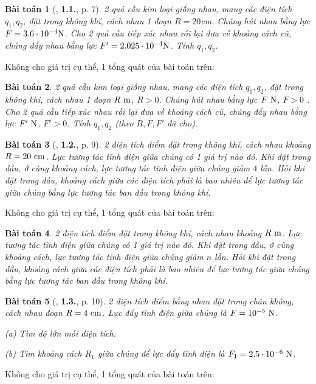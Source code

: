 \documentclass{article}
\numberwithin{equation}{section}
\newtheorem{baitoan}{Bài toán}[section]
\begin{document}
\begin{baitoan}[\cite{Giai_Toan_Vat_Ly_11_tap_1}, \textbf{1.1.}, p. 7]
	2 quả cầu kim loại giống nhau, mang các điện tích $q_1,q_2$, đặt trong không khí, cách nhau 1 đoạn $R = 20$cm. Chúng hút nhau bằng lực $F = 3.6\cdot 10^{-4}{\rm N}$. Cho 2 quả cầu tiếp xúc nhau rồi lại đưa về khoảng cách cũ, chúng đẩy nhau bằng lực $F' = 2.025\cdot 10^{-4}{\rm N}$. Tính $q_1,q_2$.
\end{baitoan}
Không cho giá trị cụ thể, 1 tổng quát của bài toán trên:

\begin{baitoan}
	2 quả cầu kim loại giống nhau, mang các điện tích $q_1,q_2$, đặt trong không khí, cách nhau 1 đoạn $R\ {\rm m}$, $R > 0$. Chúng hút nhau bằng lực $F\ {\rm N}$, $F > 0$ . Cho 2 quả cầu tiếp xúc nhau rồi lại đưa về khoảng cách cũ, chúng đẩy nhau bằng lực $F'\ {\rm N}$, $F' > 0$. Tính $q_1,q_2$ (theo $R,F,F'$ đã cho).
\end{baitoan}

\begin{baitoan}[\cite{Giai_Toan_Vat_Ly_11_tap_1}, \textbf{1.2.}, p. 9]
	2 điện tích điểm đặt trong không khí, cách nhau khoảng $R = 20\ {\rm cm}$. Lực tương tác tĩnh điện giữa chúng có 1 giá trị nào đó. Khi đặt trong dầu, ở cùng khoảng cách, lực tương tác tĩnh điện giữa chúng giảm $4$ lần. Hỏi khi đặt trong dầu, khoảng cách giữa các điện tích phải là bao nhiêu để lực tương tác giữa chúng bằng lực tương tác ban đầu trong không khí.
\end{baitoan}
Không cho giá trị cụ thể, 1 tổng quát của bài toán trên:

\begin{baitoan}
	2 điện tích điểm đặt trong không khí, cách nhau khoảng $R\ {\rm m}$. Lực tương tác tĩnh điện giữa chúng có 1 giá trị nào đó. Khi đặt trong dầu, ở cùng khoảng cách, lực tương tác tĩnh điện giữa chúng giảm $n$ lần. Hỏi khi đặt trong dầu, khoảng cách giữa các điện tích phải là bao nhiêu để lực tương tác giữa chúng bằng lực tương tác ban đầu trong không khí.
\end{baitoan}

\begin{baitoan}[\cite{Giai_Toan_Vat_Ly_11_tap_1}, \textbf{1.3.}, p. 10]
	2 điện tích điểm bằng nhau đặt trong chân không, cách nhau đoạn $R = 4\ {\rm cm}$. Lực đẩy tĩnh điện giữa chúng là $F = 10^{-5}\ {\rm N}$.
	\begin{enumerate*}
		 \item[(a)] Tìm độ lớn mỗi điện tích.
		 \item[(b)] Tìm khoảng cách $R_1$ giữa chúng để lực đẩy tĩnh điện là $F_1 = 2.5\cdot 10^{-6}\ {\rm N}$.
	\end{enumerate*}
\end{baitoan}
Không cho giá trị cụ thể, 1 tổng quát của bài toán trên:
\end{document}
